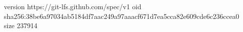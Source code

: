 version https://git-lfs.github.com/spec/v1
oid sha256:38be6a97034ab5184df7aac249a97aaacf671d7ea5cca82e609cde6c236ccea0
size 237914
